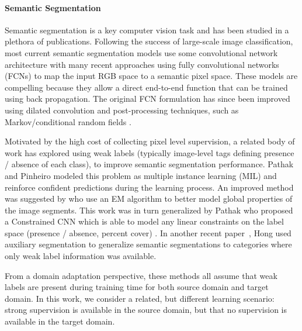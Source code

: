 \documentclass[10pt,twocolumn,letterpaper]{article}
\begin{document}
\paragraph{Semantic Segmentation}  
Semantic segmentation is a key computer vision task and has been studied in a plethora of publications. 
Following the success of large-scale image classification, most current semantic segmentation models use some convolutional network architecture \cite{farabet2013learning,hariharan2014simultaneous} with many recent approaches using fully convolutional networks (FCNs) \cite{long2015fully} to map the input RGB space to a semantic pixel space. 
These models are compelling because they allow a direct end-to-end function that can be trained using back propagation. 
The original FCN formulation has since been improved using dilated convolution \cite{yu2016multi} and post-processing techniques, such as Markov/conditional random fields \cite{chen2015semantic,liu2015semantic,zheng2015conditional}. 

Motivated by the high cost of collecting pixel level supervision, a related body of work has explored using weak labels (typically image-level tags defining presence / absence of each class), to improve semantic segmentation performance. 
Pathak \etal \cite{pathak2015fully} and Pinheiro \etal \cite{pinheiro2015image} modeled this problem as multiple instance learning (MIL) and reinforce confident predictions during the learning process. 
An improved method was suggested by \cite{papandreou2015weakly} who use an EM algorithm to better model global properties of the image segments. 
This work was in turn generalized by Pathak \etal who proposed a Constrained CNN which is able to model any linear constraints on the label space (\ie presence / absence, percent cover) \cite{pathak2015constrained}. 
In another recent paper~\cite{hong2016learning}, Hong \etal used auxiliary segmentation to generalize semantic segmentations to categories where only weak label information was available.

From a domain adaptation perspective, these methods all assume that weak labels are present during training time for both source domain and target domain. 
In this work, we consider a related, but different learning scenario: strong supervision is available in the source domain, but that no supervision is available in the target domain. 
\vspace{-3mm}
\end{document}
